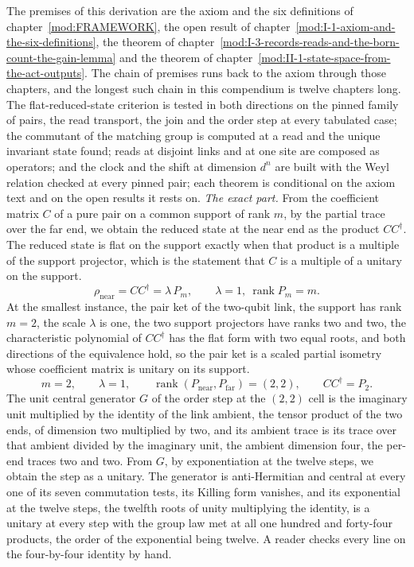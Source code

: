 \begin{chproof}
The premises of this derivation are the axiom and the six definitions of chapter~\ref{mod:FRAMEWORK}, the open result of chapter~\ref{mod:I-1-axiom-and-the-six-definitions}, the theorem of chapter~\ref{mod:I-3-records-reads-and-the-born-count-the-gain-lemma} and the theorem of chapter~\ref{mod:II-1-state-space-from-the-act-outputs}. The chain of premises runs back to the axiom through those chapters, and the longest such chain in this compendium is twelve chapters long.
The flat-reduced-state criterion is tested in both directions on the pinned family of pairs, the read transport, the join and the order step at every tabulated case; the commutant of the matching group is computed at a read and the unique invariant state found; reads at disjoint links and at one site are composed as operators; and the clock and the shift at dimension $d^n$ are built with the Weyl relation checked at every pinned pair; each theorem is conditional on the axiom text and on the open results it rests on.
\textit{The exact part.}
From the coefficient matrix $C$ of a pure pair on a common support of rank $m$, by the partial trace over the far end, we obtain the reduced state at the near end as the product $C C^{\dagger}$. The reduced state is flat on the support exactly when that product is a multiple of the support projector, which is the statement that $C$ is a multiple of a unitary on the support.
\begin{equation}
\rho_{\mathrm{near}} = C C^{\dagger} = \lambda\, P_{m}, \qquad \lambda = 1,\ \operatorname{rank} P_{m} = m .
\end{equation}
At the smallest instance, the pair ket of the two-qubit link, the support has rank $m = 2$, the scale $\lambda$ is one, the two support projectors have ranks two and two, the characteristic polynomial of $C C^{\dagger}$ has the flat form with two equal roots, and both directions of the equivalence hold, so the pair ket is a scaled partial isometry whose coefficient matrix is unitary on its support.
\begin{equation}
m = 2, \qquad \lambda = 1, \qquad \operatorname{rank}(P_{\mathrm{near}}, P_{\mathrm{far}}) = (2, 2), \qquad C C^{\dagger} = P_{2} .
\end{equation}
The unit central generator $G$ of the order step at the $(2,2)$ cell is the imaginary unit multiplied by the identity of the link ambient, the tensor product of the two ends, of dimension two multiplied by two, and its ambient trace is its trace over that ambient divided by the imaginary unit, the ambient dimension four, the per-end traces two and two. From $G$, by exponentiation at the twelve steps, we obtain the step as a unitary. The generator is anti-Hermitian and central at every one of its seven commutation tests, its Killing form vanishes, and its exponential at the twelve steps, the twelfth roots of unity multiplying the identity, is a unitary at every step with the group law met at all one hundred and forty-four products, the order of the exponential being twelve. A reader checks every line on the four-by-four identity by hand.

\end{chproof}

